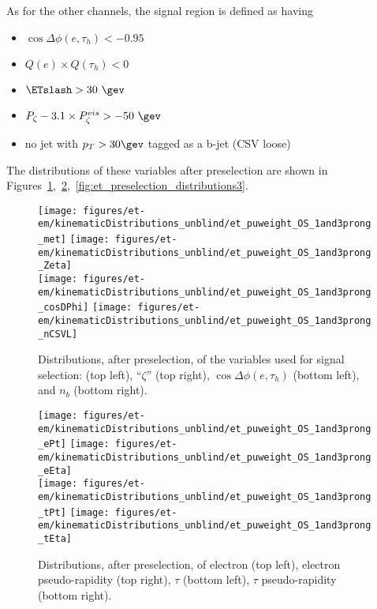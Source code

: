As for the other channels, the signal region is defined as having
\begin{itemize}
  \item $\cos{\Delta \phi (e,\tau_{h})}<-0.95$
  \item $Q(e) \times Q(\tau_{h}) < 0 $
  \item $\ETslash>30~\gev$
  \item $P_{\zeta}- 3.1 \times P_{\zeta}^{vis} > -50~\gev$
  \item no jet with $p_T>30\gev$ tagged as a b-jet (CSV loose)
\end{itemize}

The distributions of these variables after preselection are shown in
Figures~\ref{fig:et_preselection_distributions1},~\ref{fig:et_preselection_distributions2},~\ref{fig:et_preselection_distributions3}.

\begin{figure}\centering
  \texttt{[image: figures/et-em/kinematicDistributions\_unblind/et\_puweight\_OS\_1and3prong\_met]}
  \texttt{[image: figures/et-em/kinematicDistributions\_unblind/et\_puweight\_OS\_1and3prong\_Zeta]} \\
  \texttt{[image: figures/et-em/kinematicDistributions\_unblind/et\_puweight\_OS\_1and3prong\_cosDPhi]}
  \texttt{[image: figures/et-em/kinematicDistributions\_unblind/et\_puweight\_OS\_1and3prong\_nCSVL]}
  \caption{\label{fig:et_preselection_distributions1} Distributions,
    after preselection, of the variables used for \teth signal
    selection: \ETslash (top left), ``$\zeta$'' (top right),
    $\cos{\Delta \phi (e,\tau_{h})}$ (bottom left), and $n_b$ (bottom
    right).}
\end{figure}

\begin{figure}\centering
  \texttt{[image: figures/et-em/kinematicDistributions\_unblind/et\_puweight\_OS\_1and3prong\_ePt]}
  \texttt{[image: figures/et-em/kinematicDistributions\_unblind/et\_puweight\_OS\_1and3prong\_eEta]} \\
  \texttt{[image: figures/et-em/kinematicDistributions\_unblind/et\_puweight\_OS\_1and3prong\_tPt]}
  \texttt{[image: figures/et-em/kinematicDistributions\_unblind/et\_puweight\_OS\_1and3prong\_tEta]}
  \caption{\label{fig:et_preselection_distributions2} Distributions,
    after \teth preselection, of electron \pt (top left), electron
    pseudo-rapidity (top right), $\tau$ \pt (bottom left), $\tau$
    pseudo-rapidity (bottom right).}
\end{figure}

